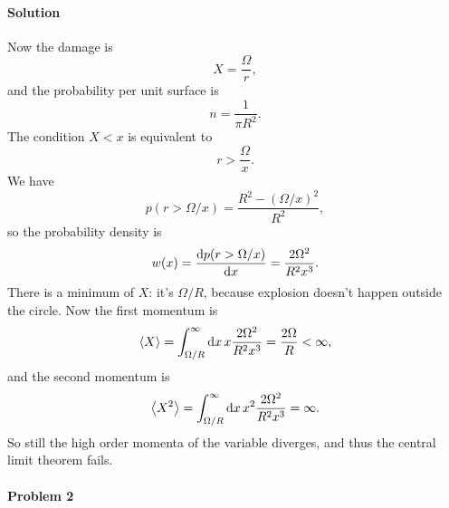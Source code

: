 \documentclass[hyperref, a4paper]{article}
\begin{document}
\paragraph{Solution} Now the damage is 
\begin{equation}
    X = \frac{\Omega}{r},
\end{equation}
and the probability per unit surface is 
\[
    n = \frac{1}{\pi R^2}.
\]
The condition $X < x$ is equivalent to 
\begin{equation}
    r > \frac{\Omega}{x}.
\end{equation}
We have 
\begin{equation}
    p(r > \Omega / x) = \frac{R^2 - (\Omega / x)^2}{R^2},
\end{equation}
so the probability density is 
\begin{equation}
    w(x) = \dv{p(r > \Omega / x)}{x} = \frac{2 \Omega^2}{R^2 x^3}.
\end{equation}
There is a minimum of $X$: it's $\Omega / R$,
because explosion doesn't happen outside the circle.
Now the first momentum is 
\begin{equation}
    \expval{X} = \int^\infty_{\Omega / R} \dd{x} x \frac{2 \Omega^2}{R^2 x^3} = \frac{2 \Omega}{R} < \infty,
\end{equation}
and the second momentum is 
\begin{equation}
    \expval{X^2} = \int^\infty_{\Omega / R} \dd{x} x^2 \frac{2 \Omega^2}{R^2 x^3} = \infty.
\end{equation}
So still the high order momenta of the variable diverges,
and thus the central limit theorem fails.

\paragraph{Problem 2} 
\end{document}
